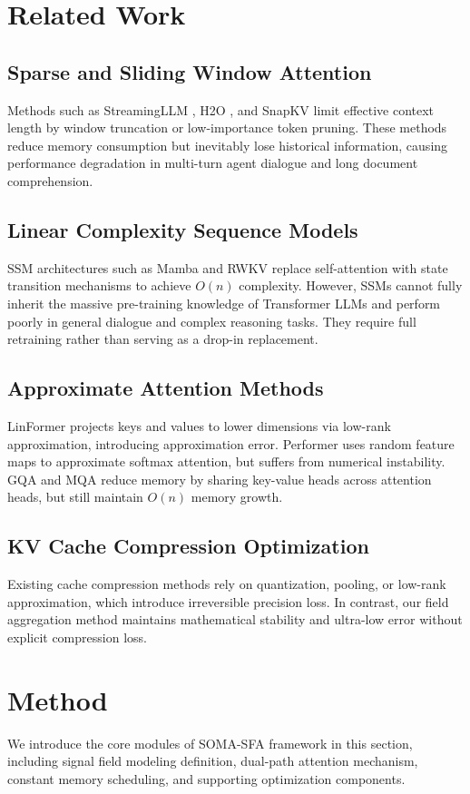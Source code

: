 \documentclass{article}
\begin{document}
\section{Related Work}
\subsection{Sparse and Sliding Window Attention}
Methods such as StreamingLLM \cite{streamingllm2024}, H2O \cite{h2o2023}, and SnapKV \cite{snapkv2024} limit effective context length by window truncation or low-importance token pruning. These methods reduce memory consumption but inevitably lose historical information, causing performance degradation in multi-turn agent dialogue and long document comprehension.

\subsection{Linear Complexity Sequence Models}
SSM architectures such as Mamba \cite{mamba2024} and RWKV \cite{rwkv2023} replace self-attention with state transition mechanisms to achieve $O(n)$ complexity. However, SSMs cannot fully inherit the massive pre-training knowledge of Transformer LLMs and perform poorly in general dialogue and complex reasoning tasks. They require full retraining rather than serving as a drop-in replacement.

\subsection{Approximate Attention Methods}
LinFormer \cite{linformer} projects keys and values to lower dimensions via low-rank approximation, introducing approximation error. Performer \cite{performer} uses random feature maps to approximate softmax attention, but suffers from numerical instability. GQA \cite{gqa} and MQA \cite{mqa} reduce memory by sharing key-value heads across attention heads, but still maintain $O(n)$ memory growth.

\subsection{KV Cache Compression Optimization}
Existing cache compression methods rely on quantization, pooling, or low-rank approximation, which introduce irreversible precision loss. In contrast, our field aggregation method maintains mathematical stability and ultra-low error without explicit compression loss.

\section{Method}
We introduce the core modules of SOMA-SFA framework in this section, including signal field modeling definition, dual-path attention mechanism, constant memory scheduling, and supporting optimization components.
\end{document}
